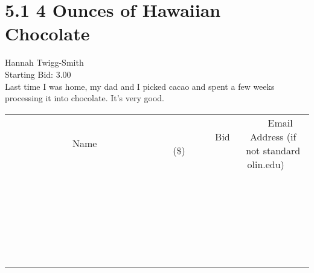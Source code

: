 \documentclass[11pt]{article}
\begin{document}
					\section*{5.1 4 Ounces of Hawaiian Chocolate}
					Hannah Twigg-Smith \\
					Starting Bid: 3.00 \\
					Last time I was home, my dad and I picked cacao and spent a few weeks processing it into chocolate. It's very good. \\
					[6ex]
					\begin{tabular}{c c c}
						~~~~~~~~~~~~~Name~~~~~~~~~~~~~ & ~~~~~~~~~Bid (\$)~~~~~~~~~ & ~~~Email Address (if not standard olin.edu)~~~ \\
				
 & & \\
\hline
 & & \\
\hline
 & & \\
\hline
 & & \\
\hline
 & & \\
\hline
 & & \\
\hline
 & & \\
\hline
 & & \\
\hline
 & & \\
\hline
 & & \\
\hline
 & & \\
\hline
 & & \\
\hline
 & & \\
\hline
 & & \\
\hline
 & & \\
\hline
 & & \\
\hline
 & & \\
\hline
 & & \\
\hline
 & & \\
\hline
 & & \\
\hline
 & & \\
\hline
 & & \\
\hline
 & & \\
\hline
 & & \\
\hline
 & & \\
\hline
 & & \\
\hline
					\end{tabular}
					\clearpage
				
\end{document}
